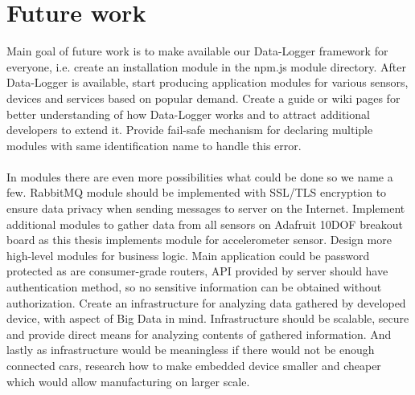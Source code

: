 \section{Future work} %
\label{sec:future_work}
Main goal of future work is to make available our Data-Logger framework for everyone, i.e. create an installation module in the npm.js module directory. After Data-Logger is available, start producing application modules for various sensors, devices and services based on popular demand. Create a guide or wiki pages for better understanding of how Data-Logger works and to attract additional developers to extend it. Provide fail-safe mechanism for declaring multiple modules with same identification name to handle this error.\\\\
In modules there are even more possibilities what could be done so we name a few. RabbitMQ module should be implemented with SSL/TLS encryption to ensure data privacy when sending messages to server on the Internet. Implement additional modules to gather data from all sensors on Adafruit 10DOF breakout board as this thesis implements module for accelerometer sensor. Design more high-level modules for business logic.
Main application could be password protected as are consumer-grade routers, API provided by server should have authentication method, so no sensitive information can be obtained without authorization. Create an infrastructure for analyzing data gathered by developed device, with aspect of Big Data in mind. Infrastructure should be scalable, secure and provide direct means for analyzing contents of gathered information. And lastly as infrastructure would be meaningless if there would not be enough connected cars, research how to make embedded device smaller and cheaper which would allow manufacturing on larger scale.
